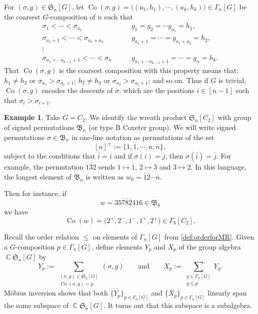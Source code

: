 \documentclass[11pt, oneside, reqno]{amsart}
\theoremstyle{definition}
\newtheorem{example}[theorem]{Example}
\numberwithin{equation}{section}
\DeclareMathOperator{\C}{\mathbb{C}}
\def \kk{\C}
\def \ol{\overline}
\def \sym{\mathfrak{S}}
\def \ztwo {{C_2}}
\def \gcomposition{{\Gamma_n[G]}}
\def\qqand{\qquad\text{and}\qquad}
\DeclareMathOperator{\co}{Co}
\begin{document}
For $(\sigma, g) \in \sym_n[G]$, let $\co(\sigma,g) = \big((a_1,h_1), \cdots, (a_k,h_k)\big) \in \gcomposition$ be the coarsest $G$-composition of $n$ such that
\begin{align*}
    \sigma_1 < \cdots < \sigma_{a_1} & \hspace{2em} g_1 = g_2 = \cdots g_{a_1} = h_1, \\
    \sigma_{a_{1}+1}< \cdots < \sigma_{a_{1}+a_{2}} & \hspace{2em} g_{a_{1}+1} = \cdots = g_{a_{1}+a_{2}} = h_2, \\
    \vdots \\
    \sigma_{a_{1}+\cdots a_{k-1}+1} < \cdots < \sigma_n & \hspace{2em} g_{a_{1}+\cdots a_{k-1}+1} = \cdots = g_n =h_k.
\end{align*}
That $\co(\sigma,g)$ is the coarsest composition with this property means that: $h_1 \neq h_2$ or $\sigma_{a_1} > \sigma_{a_1+1}$; $h_2 \neq h_3$ or $\sigma_{a_2} > \sigma_{a_2+1}$; and so on.
Thus if $G$ is trivial, $\co(\sigma,g)$ encodes the descents of $\sigma$, which are the positions $i \in [n-1]$ such that $\sigma_i > \sigma_{i+1}$.  

\begin{example}
    Take $G = \ztwo$.
    We identify the wreath product $\sym_n[\ztwo]$ with group of signed permutations $\mathfrak{B}_n$ (or type B Coxeter group). We will write signed permutations $\sigma \in \mathfrak{B}_n$ in one-line notation as permutations of the set 
    \[ [n]^{\pm}:= \{ 1, \ol{1}, \cdots, n, \ol{n} \},\]
subject to the conditions that $\ol{\ol{i}} = i$ and if $\sigma(i) = j$, then $\sigma(\ol{i}) = \ol{j}$. For example, the permutation $\ol{1}\ol{3}2$ sends $1\mapsto \ol{1}$, $2 \mapsto \ol{3}$ and $3\mapsto 2$.
In this language, the longest element of $\mathfrak{B}_n$ is written as $w_0 = \ol{1}\ol{2}\cdots \ol{n}$.
  
Then for instance, if 
\[      w = 3 5 \ol{7} \ol{8} \ol{2} 4 1 6 \in \mathfrak{B}_8
    \]
    we have
    \[
        \co(w) = \big( 2^{+}, 2^{-} , 1^{-} , 1^{+} , 2^{+} \big) \in \Gamma_8[\ztwo].
    \]
\end{example}




Recall the order relation $\leq$ on elements of $\Gamma_n[G]$ from \cref{def:orderforMR}. Given a $G$-composition $p \in \Gamma_n[G]$, define elements $Y_p$ and $X_p$ of the group algebra $\kk \sym_n[G]$ by
\[
    Y_{p} := \sum_{\substack{(\sigma,g) \in \sym_n[G]\\ \co(\sigma,g) = p}} (\sigma,g) 
    \qqand
    X_{p} := \sum_{\substack{q \in \Gamma_n[G] \\ q \leq p}} Y_{q}.
\]
Möbius inversion shows that both $\{ Y_{p} \}_{p \in \Gamma_n[G]}$ and $\{ X_{p} \}_{p \in \Gamma_n[G]}$ linearly span the same subspace of $\kk \sym_n[G]$.
It turns out that this subspace is a subalgebra.
\end{document}
